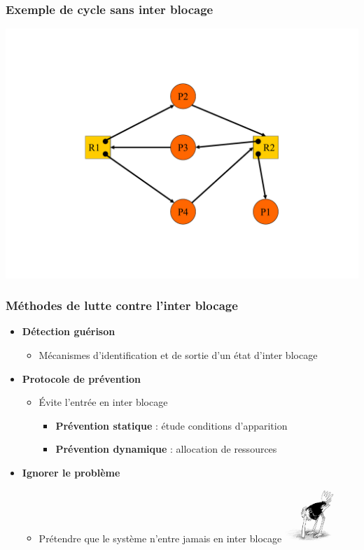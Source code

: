 \begin{frame}
\frametitle{Exemple de cycle sans inter blocage}
\includegraphics[width=.8\textwidth]{../illustration/graphe_alloc_ressource_cycle_sans_ib.pdf}
\end{frame}

\begin{frame}
\frametitle{Méthodes de lutte contre l’inter blocage}
\begin{itemize}
\item \textbf{Détection guérison}
\begin{itemize}
\item Mécanismes d’identification et de sortie d’un état d’inter blocage
\end{itemize}
\item \textbf{Protocole de prévention}
\begin{itemize}
\item Évite l’entrée en inter blocage
\begin{itemize}
\item \textbf{Prévention statique} : étude conditions d’apparition
\item \textbf{Prévention dynamique} : allocation de ressources
\end{itemize}
\end{itemize}
\item \textbf{Ignorer le problème}
\begin{itemize}
\item Prétendre que le système n’entre jamais en inter blocage
\includegraphics[width=2cm]{../illustration/autruche.jpg}
\end{itemize}
\end{itemize}
\end{frame}

